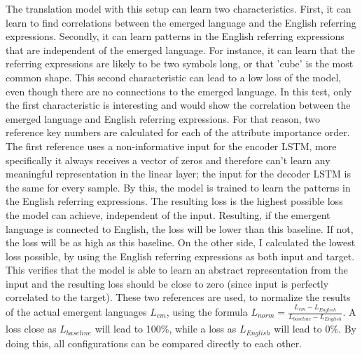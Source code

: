 The translation model with this setup can learn two characteristics.
First, it can learn to find correlations between the emerged language and the English referring expressions.
Secondly, it can learn patterns in the English referring expressions that are independent of the emerged language.
For instance, it can learn that the referring expressions are likely to be two symbols long, or that 'cube' is the most common shape.
This second characteristic can lead to a low loss of the model, even though there are no connections to the emerged language.
In this test, only the first characteristic is interesting and would show the correlation between the emerged language and English referring expressions.
For that reason, two reference key numbers are calculated for each of the attribute importance order.
The first reference uses a non-informative input for the encoder LSTM, more specifically it always receives a vector of zeros and therefore can't learn any meaningful representation in the linear layer; the input for the decoder LSTM is the same for every sample.
By this, the model is trained to learn the patterns in the English referring expressions.
The resulting loss is the highest possible loss the model can achieve, independent of the input.
Resulting, if the emergent language is connected to English, the loss will be lower than this baseline.
If not, the loss will be as high as this baseline.
On the other side, I calculated the lowest loss possible, by using the English referring expressions as both input and target.
This verifies that the model is able to learn an abstract representation from the input and the resulting loss should be close to zero (since input is perfectly correlated to the target).
These two references are used, to normalize the results of the actual emergent languages $L_{em}$, using the formula $L_{norm} = \frac{L_{em}-L_{English}}{L_{baseline} - L_{English}}$.
A loss close as $L_{baseline}$ will lead to 100\%, while a loss as $L_{English}$ will lead to 0\%.
By doing this, all configurations can be compared directly to each other.

